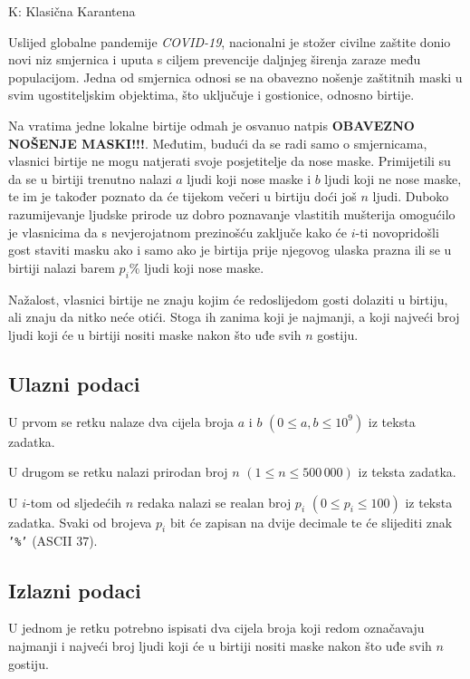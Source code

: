 \begin{statement}[
  timelimit=1 s,
  memorylimit=512 MiB,
]{K: Klasična Karantena}

Uslijed globalne pandemije \textit{COVID-19}, nacionalni je stožer civilne
zaštite donio novi niz smjernica i uputa s ciljem prevencije daljnjeg širenja
zaraze među populacijom. Jedna od smjernica odnosi se na obavezno nošenje
zaštitnih maski u svim ugostiteljskim objektima, što uključuje i gostionice,
odnosno birtije.

Na vratima jedne lokalne birtije odmah je osvanuo natpis \textbf{OBAVEZNO
NOŠENJE MASKI!!!}. Međutim, budući da se radi samo o smjernicama, vlasnici
birtije ne mogu natjerati svoje posjetitelje da nose maske. Primijetili su da
se u birtiji trenutno nalazi $a$ ljudi koji nose maske i $b$ ljudi koji ne
nose maske, te im je također poznato da će tijekom večeri u birtiju doći još
$n$ ljudi. Duboko razumijevanje ljudske prirode uz dobro poznavanje vlastitih
mušterija omogućilo je vlasnicima da s nevjerojatnom prezinošću zaključe kako
će $i$-ti novopridošli gost staviti masku ako i samo ako je birtija prije
njegovog ulaska prazna ili se u birtiji nalazi barem $p_i\%$ ljudi koji nose
maske.

Nažalost, vlasnici birtije ne znaju kojim će redoslijedom gosti dolaziti u
birtiju, ali znaju da nitko neće otići. Stoga ih zanima koji je najmanji,
a koji najveći broj ljudi koji će u birtiji nositi maske nakon što uđe svih
$n$ gostiju.

\subsection*{Ulazni podaci}
U prvom se retku nalaze dva cijela broja $a$ i $b$ $(0 \le a, b \le 10^9)$ iz
teksta zadatka.

U drugom se retku nalazi prirodan broj $n$ $(1 \le n \le 500\,000)$ iz teksta
zadatka.

U $i$-tom od sljedećih $n$ redaka nalazi se realan broj $p_i$ $(0 \le p_i \le
100)$ iz teksta zadatka. Svaki od brojeva $p_i$ bit će zapisan na dvije
decimale te će slijediti znak \texttt{'\%'} (ASCII $37$).

\subsection*{Izlazni podaci}
U jednom je retku potrebno ispisati dva cijela broja koji redom označavaju
najmanji i najveći broj ljudi koji će u birtiji nositi maske nakon što uđe
svih $n$ gostiju.


\end{statement}
